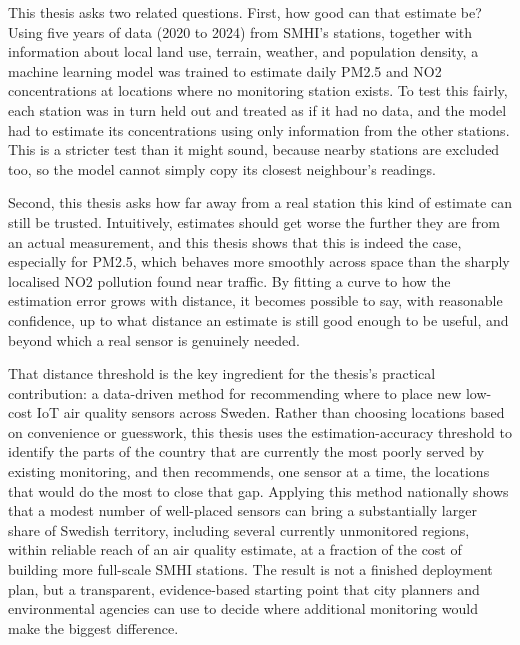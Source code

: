 \documentclass[11pt,a4paper]{article}
\begin{document}
This thesis asks two related questions. First, how good can that estimate be? Using five years of data (2020 to 2024) from SMHI's stations, together with information about local land use, terrain, weather, and population density, a machine learning model was trained to estimate daily PM2.5 and NO2 concentrations at locations where no monitoring station exists. To test this fairly, each station was in turn held out and treated as if it had no data, and the model had to estimate its concentrations using only information from the other stations. This is a stricter test than it might sound, because nearby stations are excluded too, so the model cannot simply copy its closest neighbour's readings.

Second, this thesis asks how far away from a real station this kind of estimate can still be trusted. Intuitively, estimates should get worse the further they are from an actual measurement, and this thesis shows that this is indeed the case, especially for PM2.5, which behaves more smoothly across space than the sharply localised NO2 pollution found near traffic. By fitting a curve to how the estimation error grows with distance, it becomes possible to say, with reasonable confidence, up to what distance an estimate is still good enough to be useful, and beyond which a real sensor is genuinely needed.

That distance threshold is the key ingredient for the thesis's practical contribution: a data-driven method for recommending where to place new low-cost IoT air quality sensors across Sweden. Rather than choosing locations based on convenience or guesswork, this thesis uses the estimation-accuracy threshold to identify the parts of the country that are currently the most poorly served by existing monitoring, and then recommends, one sensor at a time, the locations that would do the most to close that gap. Applying this method nationally shows that a modest number of well-placed sensors can bring a substantially larger share of Swedish territory, including several currently unmonitored regions, within reliable reach of an air quality estimate, at a fraction of the cost of building more full-scale SMHI stations. The result is not a finished deployment plan, but a transparent, evidence-based starting point that city planners and environmental agencies can use to decide where additional monitoring would make the biggest difference.

\clearpage

\end{document}
